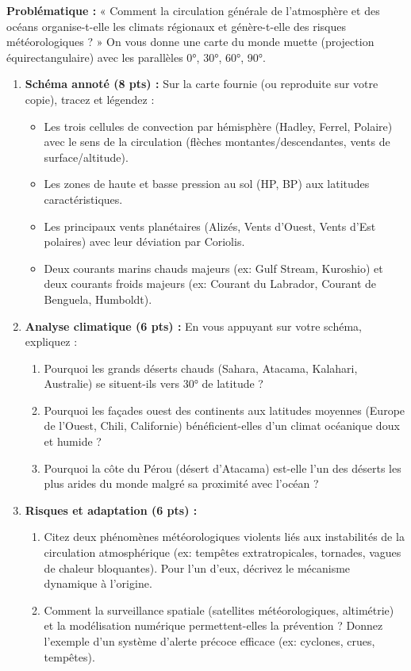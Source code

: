 \documentclass[11pt]{article}
\begin{document}
\begin{exercice}
\textbf{Problématique :} « Comment la circulation générale de l'atmosphère et des océans organise-t-elle les climats régionaux et génère-t-elle des risques météorologiques ? »
On vous donne une carte du monde muette (projection équirectangulaire) avec les parallèles 0°, 30°, 60°, 90°.
\begin{enumerate}
    \item \textbf{Schéma annoté (8 pts) :} Sur la carte fournie (ou reproduite sur votre copie), tracez et légendez :
    \begin{itemize}
        \item Les trois cellules de convection par hémisphère (Hadley, Ferrel, Polaire) avec le sens de la circulation (flèches montantes/descendantes, vents de surface/altitude).
        \item Les zones de haute et basse pression au sol (HP, BP) aux latitudes caractéristiques.
        \item Les principaux vents planétaires (Alizés, Vents d'Ouest, Vents d'Est polaires) avec leur déviation par Coriolis.
        \item Deux courants marins chauds majeurs (ex: Gulf Stream, Kuroshio) et deux courants froids majeurs (ex: Courant du Labrador, Courant de Benguela, Humboldt).
    \end{itemize}
    \item \textbf{Analyse climatique (6 pts) :} En vous appuyant sur votre schéma, expliquez :
    \begin{enumerate}
        \item Pourquoi les grands déserts chauds (Sahara, Atacama, Kalahari, Australie) se situent-ils vers 30° de latitude ?
        \item Pourquoi les façades ouest des continents aux latitudes moyennes (Europe de l'Ouest, Chili, Californie) bénéficient-elles d'un climat océanique doux et humide ?
        \item Pourquoi la côte du Pérou (désert d'Atacama) est-elle l'un des déserts les plus arides du monde malgré sa proximité avec l'océan ?
    \end{enumerate}
    \item \textbf{Risques et adaptation (6 pts) :}
    \begin{enumerate}
        \item Citez deux phénomènes météorologiques violents liés aux instabilités de la circulation atmosphérique (ex: tempêtes extratropicales, tornades, vagues de chaleur bloquantes). Pour l'un d'eux, décrivez le mécanisme dynamique à l'origine.
        \item Comment la surveillance spatiale (satellites météorologiques, altimétrie) et la modélisation numérique permettent-elles la prévention ? Donnez l'exemple d'un système d'alerte précoce efficace (ex: cyclones, crues, tempêtes).
    \end{enumerate}
\end{enumerate}
\end{exercice}
\end{document}
